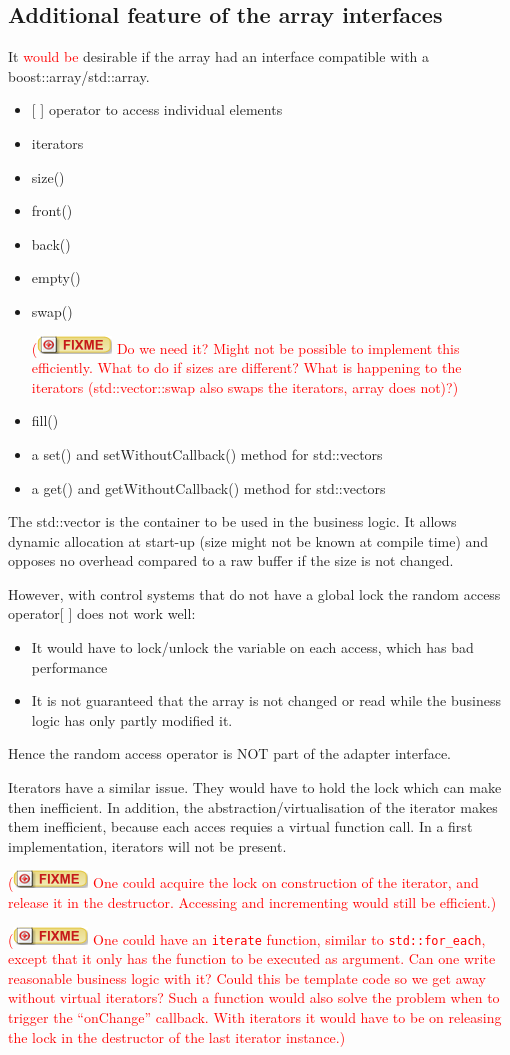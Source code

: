 \documentclass[11pt,a4paper]{scrartcl}
\newcounter{nFixmes}
\newcommand{\fixme}[1]{\addtocounter{nFixmes}{1}\textcolor{red}{(\includegraphics[height=2ex]{fixme} #1)}\xspace}
\begin{document}
\subsection{Additional feature of the array interfaces}
It \textcolor{red}{would be} desirable if the array had an interface compatible 
with a boost::array/std::array.
\begin{itemize}
\item {[ ]} operator to access individual elements
\item iterators
\item size()
\item front()
\item back()
\item empty()
\item swap() \fixme{Do we need it? Might not be possible to implement this efficiently. What to do if sizes are different? What is happening to the iterators (std::vector::swap also swaps the iterators, array does not)?}
\item fill()
\item a set() and setWithoutCallback() method for std::vectors
\item a get() and getWithoutCallback() method for std::vectors
\end{itemize}
The std::vector is the container to be used in the business logic. It allows dynamic allocation at
start-up (size might not be known at compile time) and opposes no overhead compared to
a raw buffer if the size is not changed.

However, with control systems that do not have a global lock the random access operator{[ ]} does not
work well:
\begin{itemize}
\item It would have to lock/unlock the variable on each access, which has bad performance
\item It is not guaranteed that the array is not changed or read while the business logic has only
      partly modified it.
\end{itemize}
Hence the random access operator is NOT part of the adapter interface.

Iterators have a similar issue. They would have to hold the lock which can make then inefficient.
In addition, the abstraction/virtualisation of the iterator makes them inefficient, because each acces
requies a virtual function call. In a first implementation, iterators will not be present.\\
\fixme{One could acquire the lock on construction of the iterator, and release it in the destructor.
Accessing and incrementing would still be efficient.}\\
\fixme{One could have an \texttt{iterate} function, similar to \texttt{std::for\_each}, except that it 
only has the function to be executed as argument. Can one write reasonable business logic with it?
Could this be template code so we get away without virtual iterators?
Such a function would also solve the problem when to trigger the ``onChange'' callback. With iterators 
it would have to be on releasing the lock in the destructor of the last iterator instance.}
\end{document}
